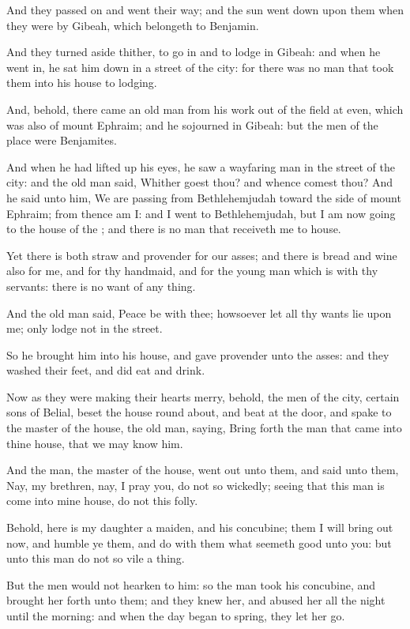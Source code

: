\Verse And they passed on and went their way; and the sun went down upon them when they were by Gibeah, which belongeth to Benjamin.

\Verse And they turned aside thither, to go in and to lodge in Gibeah: and when he went in, he sat him down in a street of the city: for there was no man that took them into his house to lodging.

\Verse And, behold, there came an old man from his work out of the field at even, which was also of mount Ephraim; and he sojourned in Gibeah: but the men of the place were Benjamites.

\Verse And when he had lifted up his eyes, he saw a wayfaring man in the street of the city: and the old man said, Whither goest thou? and whence comest thou?  \Verse And he said unto him, We are passing from Bethlehemjudah toward the side of mount Ephraim; from thence am I: and I went to Bethlehemjudah, but I am now going to the house of the \LORD; and there is no man that receiveth me to house.

\Verse Yet there is both straw and provender for our asses; and there is bread and wine also for me, and for thy handmaid, and for the young man which is with thy servants: there is no want of any thing.

\Verse And the old man said, Peace be with thee; howsoever let all thy wants lie upon me; only lodge not in the street.

\Verse So he brought him into his house, and gave provender unto the asses: and they washed their feet, and did eat and drink.

\Verse Now as they were making their hearts merry, behold, the men of the city, certain sons of Belial, beset the house round about, and beat at the door, and spake to the master of the house, the old man, saying, Bring forth the man that came into thine house, that we may know him.

\Verse And the man, the master of the house, went out unto them, and said unto them, Nay, my brethren, nay, I pray you, do not so wickedly; seeing that this man is come into mine house, do not this folly.

\Verse Behold, here is my daughter a maiden, and his concubine; them I will bring out now, and humble ye them, and do with them what seemeth good unto you: but unto this man do not so vile a thing.

\Verse But the men would not hearken to him: so the man took his concubine, and brought her forth unto them; and they knew her, and abused her all the night until the morning: and when the day began to spring, they let her go.

